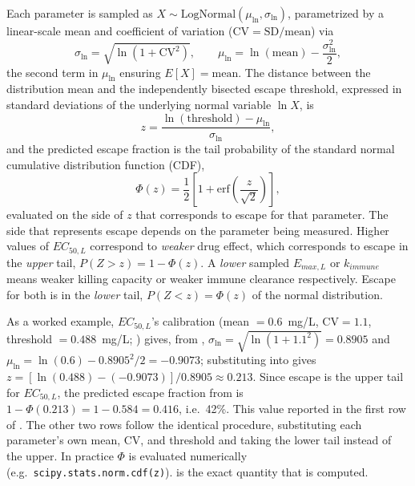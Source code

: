 \documentclass[11pt]{article}
\begin{document}
Each parameter is sampled as $X \sim \mathrm{LogNormal}(\mu_{\ln},
\sigma_{\ln})$, parametrized by a linear-scale mean and coefficient of
variation ($\mathrm{CV} = \mathrm{SD}/\mathrm{mean}$) via
\begin{equation}
    \sigma_{\ln} = \sqrt{\ln\!\left(1 + \mathrm{CV}^2\right)}, \qquad
    \mu_{\ln} = \ln(\mathrm{mean}) - \frac{\sigma_{\ln}^2}{2},
    \label{eq:lognormal_params}
\end{equation}
the second term in $\mu_{\ln}$ ensuring $E[X] = \mathrm{mean}$. The
distance between the distribution mean and the independently bisected escape
threshold, expressed in standard deviations of the underlying normal
variable $\ln X$, is
\begin{equation}
    z = \frac{\ln(\text{threshold}) - \mu_{\ln}}{\sigma_{\ln}},
    \label{eq:zscore}
\end{equation}
and the predicted escape fraction is the tail probability of the standard
normal cumulative distribution function (CDF),
\begin{equation}
    \Phi(z) = \frac{1}{2}\left[1 + \mathrm{erf}\!\left(\frac{z}{\sqrt{2}}\right)\right],
    \label{eq:phi}
\end{equation}
evaluated on the side of $z$ that corresponds to escape for that
parameter. The side that represents escape depends on the parameter being measured.  Higher values of $EC_{50,L}$ correspond to
\emph{weaker} drug effect, which corresponds to 
escape in the \emph{upper} tail, $P(Z>z) = 1-\Phi(z)$.   A \emph{lower}
sampled $E_{max,L}$ or $k_{immune}$ means weaker killing capacity or weaker
immune clearance respectively. Escape for both is in the \emph{lower}
tail, $P(Z<z) = \Phi(z)$ of the normal distribution.

As a worked example, $EC_{50,L}$'s calibration (mean $=0.6$~mg/L,
$\mathrm{CV}=1.1$, threshold $=0.488$~mg/L; ) gives, from
, $\sigma_{\ln} = \sqrt{\ln(1+1.1^2)} = 0.8905$
and $\mu_{\ln} = \ln(0.6) - 0.8905^2/2 = -0.9073$; substituting into
 gives $z = \left[\ln(0.488) - (-0.9073)\right]/0.8905
\approx 0.213$. Since escape is the upper tail for $EC_{50,L}$, the
predicted escape fraction from  is $1-\Phi(0.213) =
1-0.584 = 0.416$, i.e.\ 42\%.  This value reported in the first row of
. The other two rows follow the identical
procedure, substituting each parameter's own mean, CV, and threshold and
taking the lower tail instead of the upper. In practice $\Phi$ is evaluated
numerically (e.g.\ \texttt{scipy.stats.norm.cdf(z)}).   is the exact quantity that is computed.
\end{document}
